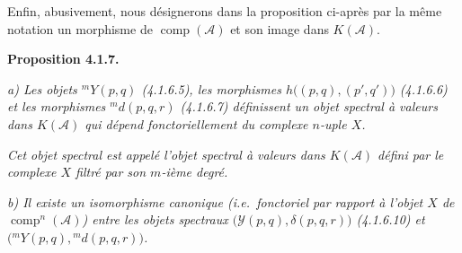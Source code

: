Enfin, abusivement, nous désignerons dans la proposition ci-après par la
même notation un morphisme de $\operatorname{comp}(\mathcal A)$ et son
image dans $K(\mathcal A)$.

\medskip\noindent\textbf{Proposition 4.1.7.}\quad

\noindent\textit{a) Les objets ${}^{m}\!Y(p,q)$ (4.1.6.5), les morphismes
$h\bigl((p,q),(p',q')\bigr)$ (4.1.6.6) et les morphismes
${}^{m}\!d(p,q,r)$ (4.1.6.7) définissent un objet spectral à valeurs dans
$K(\mathcal A)$ qui dépend fonctoriellement du complexe $n$-uple $X$.}

\noindent\textit{Cet objet spectral est appelé l'objet spectral à valeurs
dans $K(\mathcal A)$ défini par le complexe $X$ filtré par son $m$-ième
degré.}

\noindent\textit{b) Il existe un isomorphisme canonique (i.e.\ fonctoriel par
rapport à l'objet $X$ de $\operatorname{comp}^n(\mathcal A)$) entre les
objets spectraux $\bigl(\mathcal Y(p,q),\delta(p,q,r)\bigr)$ (4.1.6.10) et
$\bigl({}^{m}\!Y(p,q),{}^{m}\!d(p,q,r)\bigr)$.}
\endgroup
